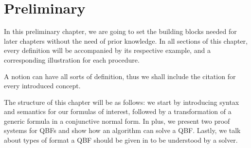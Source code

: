 \section{Preliminary}

In this preliminary chapter, we are going to set the building blocks needed for later chapters without the need of prior knowledge. In all sections of this chapter, every definition will be accompanied by its respective example, and a corresponding illustration for each procedure.

A notion can have all sorts of definition, thus we shall include the citation for every introduced concept.

The structure of this chapter will be as follows: we start by introducing syntax and semantics for our formulas of interest, followed by a transformation of a generic formula in a conjunctive normal form. In plus, we present two proof systems for QBFs and show how an algorithm can solve a QBF. Lastly, we talk about types of format a QBF should be given in to be understood by a solver.







